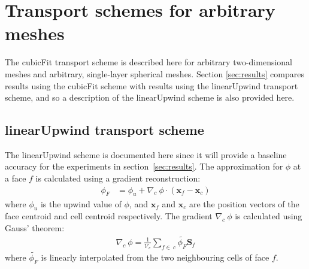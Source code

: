 \section{Transport schemes for arbitrary meshes}
The cubicFit transport scheme is described here for arbitrary two-dimensional meshes and arbitrary, single-layer spherical meshes.  Section \ref{sec:results} compares results using the cubicFit scheme with results using the linearUpwind transport scheme, and so a description of the linearUpwind scheme is also provided here.





\subsection{linearUpwind transport scheme}
The linearUpwind scheme is documented here since it will provide a baseline accuracy for the experiments in section~\ref{sec:results}.  The approximation for $\phi$ at a face $f$ is calculated using a gradient reconstruction:
\begin{align}
	\phi_F &= \phi_u + \nabla_c\: \phi \cdot \left(\mathbf{x}_f - \mathbf{x}_c \right)
\end{align} 
where $\phi_u$ is the upwind value of $\phi$, and $\mathbf{x}_f$ and $\mathbf{x}_c$ are the position vectors of the face centroid and cell centroid respectively.   The gradient $\nabla_c \:\phi$ is calculated using Gauss' theorem:
\begin{align}
	\nabla_c\: \phi = \frac{1}{\mathcal{V}_c} \sum_{f\in\:c} \tilde{\phi_F} \mathbf{S}_f
\end{align}
where $\tilde{\phi_F}$ is linearly interpolated from the two neighbouring cells of face $f$.


